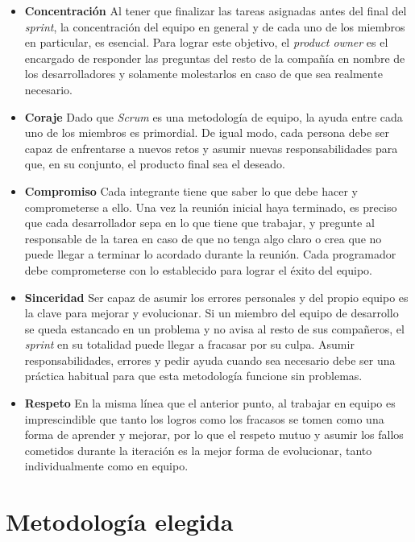 \begin{itemize}

\item{\textbf{Concentración}} Al tener que finalizar las tareas asignadas antes del final del \textit{sprint}, la concentración del equipo en general y de cada uno de los miembros en particular, es esencial. Para lograr este objetivo, el \textit{product owner} es el encargado de responder las preguntas del resto de la compañía en nombre de los desarrolladores y solamente molestarlos en caso de que sea realmente necesario.

\item{\textbf{Coraje}} Dado que \textit{Scrum} es una metodología de equipo, la ayuda entre cada uno de los miembros es primordial. De igual modo, cada persona debe ser capaz de enfrentarse a nuevos retos y asumir nuevas responsabilidades para que, en su conjunto, el producto final sea el deseado. 

\item{\textbf{Compromiso}} Cada integrante tiene que saber lo que debe hacer y comprometerse a ello. Una vez la reunión inicial haya terminado, es preciso que cada desarrollador sepa en lo que tiene que trabajar, y pregunte al responsable de la tarea en caso de que no tenga algo claro o crea que no puede llegar a terminar lo acordado durante la reunión. Cada programador debe comprometerse con lo establecido para lograr el éxito del equipo.

\item{\textbf{Sinceridad}} Ser capaz de asumir los errores personales y del propio equipo es la clave para mejorar y evolucionar. Si un miembro del equipo de desarrollo se queda estancado en un problema y no avisa al resto de sus compañeros, el \textit{sprint} en su totalidad puede llegar a fracasar por su culpa. Asumir responsabilidades, errores y pedir ayuda cuando sea necesario debe ser una práctica habitual para que esta metodología funcione sin problemas.

\item{\textbf{Respeto}} En la misma línea que el anterior punto, al trabajar en equipo es imprescindible que tanto los logros como los fracasos se tomen como una forma de aprender y mejorar, por lo que el respeto mutuo y asumir los fallos cometidos durante la iteración es la mejor forma de evolucionar, tanto individualmente como en equipo.

\end{itemize}

\section{Metodología elegida}
\label{sec:metodologiaelegida}

